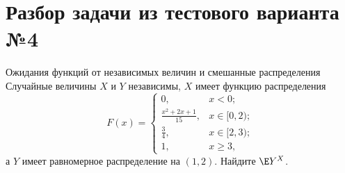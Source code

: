\section*{Разбор задачи из тестового варианта №4}
\begin{Task}{Ожидания функций от независимых величин и смешанные распределения}{}
Случайные величины $X$ и $Y$ независимы, $X$ имеет функцию распределения
\[
F(x) =
\begin{cases}
0, & x < 0; \\
\frac{x^2+2x+1}{15}, & x \in [0, 2); \\
\frac{3}{4}, & x \in [2, 3); \\
1, & x \geqslant 3,
\end{cases}
\]
а $Y$ имеет равномерное распределение на $(1, 2)$. Найдите $\E Y^X$.
\end{Task}


